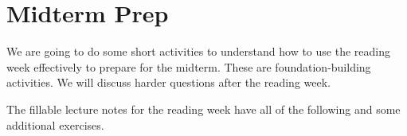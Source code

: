 \documentclass[aspectratio=169, 12pt]{beamer}
\begin{document}
















\section{Midterm Prep}

\begin{frame}
  We are going to do some short activities to understand how to use the reading week effectively to prepare for the midterm. These are foundation-building activities. We will discuss harder questions after the reading week.


  \bigskip
  The fillable lecture notes for the reading week have all of the following and some additional exercises.
\end{frame}
\end{document}
